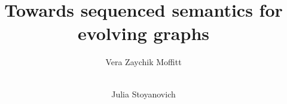 \documentclass{style/sig-alternate}
\begin{document}
\title{Towards sequenced semantics for evolving graphs}

\author{
  \alignauthor Vera Zaychik Moffitt\\
  \\
    \and
%
  \alignauthor Julia Stoyanovich\\
  \\
    \\
}


\maketitle

\thispagestyle{empty}










\end{document}
